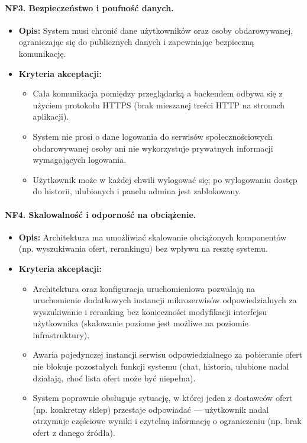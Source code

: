 \documentclass[12pt,a4paper]{article}
\begin{document}
\paragraph{NF3. Bezpieczeństwo i poufność danych.}
\begin{itemize}
    \item \textbf{Opis:} System musi chronić dane użytkowników oraz osoby obdarowywanej, ograniczając się do publicznych danych i zapewniając bezpieczną komunikację.
    \item \textbf{Kryteria akceptacji:}
    \begin{itemize}
        \item Cała komunikacja pomiędzy przeglądarką a backendem odbywa się z użyciem protokołu HTTPS (brak mieszanej treści HTTP na stronach aplikacji).
        \item System nie prosi o dane logowania do serwisów społecznościowych obdarowywanej osoby ani nie wykorzystuje prywatnych informacji wymagających logowania.
        \item Użytkownik może w każdej chwili wylogować się; po wylogowaniu dostęp do historii, ulubionych i panelu admina jest zablokowany.
    \end{itemize}
\end{itemize}

\paragraph{NF4. Skalowalność i odporność na obciążenie.}
\begin{itemize}
    \item \textbf{Opis:} Architektura ma umożliwiać skalowanie obciążonych komponentów (np. wyszukiwania ofert, rerankingu) bez wpływu na resztę systemu.
    \item \textbf{Kryteria akceptacji:}
    \begin{itemize}
        \item Architektura oraz konfiguracja uruchomieniowa pozwalają na uruchomienie dodatkowych instancji mikroserwisów odpowiedzialnych za wyszukiwanie i reranking bez konieczności modyfikacji interfejsu użytkownika (skalowanie poziome jest możliwe na poziomie infrastruktury).
        \item Awaria pojedynczej instancji serwisu odpowiedzialnego za pobieranie ofert nie blokuje pozostałych funkcji systemu (chat, historia, ulubione nadal działają, choć lista ofert może być niepełna).
        \item System poprawnie obsługuje sytuację, w której jeden z dostawców ofert (np. konkretny sklep) przestaje odpowiadać — użytkownik nadal otrzymuje częściowe wyniki i czytelną informację o ograniczeniu (np. brak ofert z danego źródła).
    \end{itemize}
\end{itemize}
\end{document}
